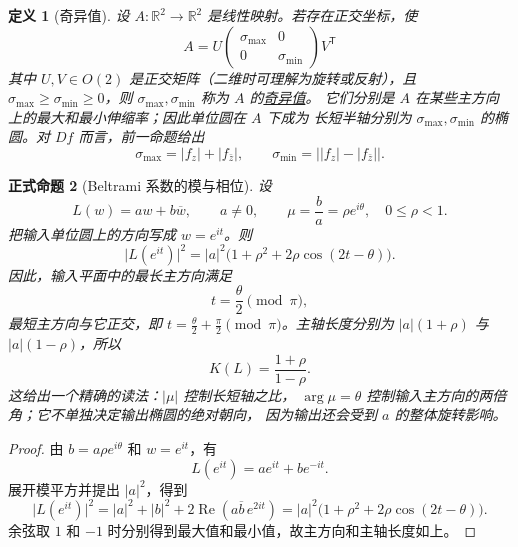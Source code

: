\documentclass[UTF8,fontset=none,a4paper,11pt]{ctexart}
\theoremstyle{foundation-definition}
\newtheorem{definition}{定义}[section]
\theoremstyle{foundation-theorem}
\theoremstyle{foundation-proposition}
\newtheorem{proposition}[definition]{正式命题}
\theoremstyle{foundation-example}
\theoremstyle{foundation-remark}
\theoremstyle{foundation-theorem}
\newcommand{\term}[2]{\hyperref[#1]{#2}}
\begin{document}
\begin{definition}[奇异值]\label{def:singular-values}
设 \(A:\mathbb R^2\to\mathbb R^2\) 是线性映射。若存在正交坐标，使
\[
A=U\begin{pmatrix}\sigma_{\max}&0\\0&\sigma_{\min}\end{pmatrix}V^{\mathsf T}
\]
其中 \(U,V\in O(2)\) 是正交矩阵（二维时可理解为旋转或反射），且
\(\sigma_{\max}\geq\sigma_{\min}\geq0\)，则
\(\sigma_{\max},\sigma_{\min}\) 称为 \(A\) 的\term{def:singular-values}{奇异值}。
它们分别是 \(A\) 在某些主方向上的最大和最小伸缩率；因此单位圆在 \(A\) 下成为
长短半轴分别为 \(\sigma_{\max},\sigma_{\min}\) 的椭圆。对 \(Df\) 而言，前一命题给出
\[
\sigma_{\max}=|f_z|+|f_{\bar z}|,\qquad
\sigma_{\min}=\bigl||f_z|-|f_{\bar z}|\bigr|.
\]
\end{definition}

\begin{proposition}[Beltrami 系数的模与相位]\label{prop:beltrami-phase-direction}
设
\[
L(w)=aw+b\overline w,\qquad a\neq0,
\qquad \mu=\frac ba=\rho e^{i\theta},
\quad 0\leq\rho<1.
\]
把输入单位圆上的方向写成 \(w=e^{it}\)。则
\[
\lvert L(e^{it})\rvert^2
 =\lvert a\rvert^2\bigl(1+\rho^2+2\rho\cos(2t-\theta)\bigr).
\]
因此，输入平面中的最长主方向满足
\[
t=\frac{\theta}{2}\pmod{\pi},
\]
最短主方向与它正交，即
\(t=\frac{\theta}{2}+\frac\pi2\pmod{\pi}\)。主轴长度分别为
\(\lvert a\rvert(1+\rho)\) 与 \(\lvert a\rvert(1-\rho)\)，所以
\[
K(L)=\frac{1+\rho}{1-\rho}.
\]
这给出一个精确的读法：\(\lvert\mu\rvert\) 控制长短轴之比，
\(\arg\mu=\theta\) 控制输入主方向的两倍角；它不单独决定输出椭圆的绝对朝向，
因为输出还会受到 \(a\) 的整体旋转影响。
\end{proposition}

\begin{proof}
由 \(b=a\rho e^{i\theta}\) 和 \(w=e^{it}\)，有
\[
L(e^{it})=ae^{it}+b e^{-it}.
\]
展开模平方并提出 \(\lvert a\rvert^2\)，得到
\[
\lvert L(e^{it})\rvert^2
 =\lvert a\rvert^2+\lvert b\rvert^2
   +2\operatorname{Re}(a\overline b\,e^{2it})
 =\lvert a\rvert^2
   \bigl(1+\rho^2+2\rho\cos(2t-\theta)\bigr).
\]
余弦取 \(1\) 和 \(-1\) 时分别得到最大值和最小值，故主方向和主轴长度如上。
\end{proof}
\end{document}
